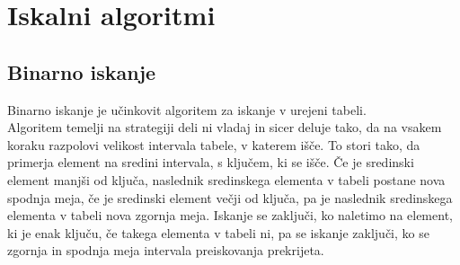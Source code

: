 \documentclass[10pt,a4paper,oneside]{book}
\begin{document}

\chapter{Iskalni algoritmi}
\section{Binarno iskanje}
Binarno iskanje je učinkovit algoritem za iskanje v urejeni tabeli.\\
Algoritem temelji na strategiji deli ni vladaj in sicer deluje tako, da na vsakem koraku razpolovi velikost intervala tabele, v katerem išče. To stori tako, da primerja element na sredini intervala, s ključem, ki se išče. Če je sredinski element manjši od ključa, naslednik sredinskega elementa v tabeli postane nova spodnja meja, če je sredinski element večji od ključa, pa je naslednik sredinskega elementa v tabeli nova zgornja meja. Iskanje se zaključi, ko naletimo na element, ki je enak ključu, če takega elementa v tabeli ni, pa se iskanje zaključi, ko se zgornja in spodnja meja intervala preiskovanja prekrijeta.



\end{document}
